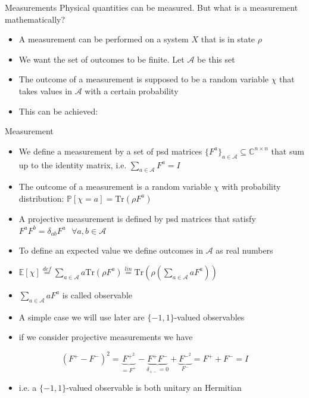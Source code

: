 \begin{frame}{Measurements}
Physical quantities can be measured. But what is a measurement mathematically? \pause
\begin{itemize}
    \item A measurement can be performed on a system $X$ that is in state $\rho$ \pause
    \item We want the set of outcomes to be finite. Let $\mathcal{A}$ be this set \pause
    \item The outcome of a measurement is supposed to be a random variable $\chi$ that takes values in $\mathcal{A}$ with a certain probability \pause
    \item This can be achieved:
\end{itemize}
\begin{definition}{Measurement}
\begin{itemize}    
     \item We define a measurement by a set of psd matrices $\{ F^a \}_{a\in \mathcal{A}} \subseteq \mathbb{C}^{n \times n}$ that sum up to the identity matrix, i.e. $\sum_{a \in \mathcal{A}} F^a = I$
    \item The outcome of a measurement is a random variable $\chi$ with probability distribution: $\mathbb{P}[ \chi = a ] = \text{Tr}(\rho F^a)$
     \item A projective measurement is defined by psd matrices that satisfy $F^aF^b = \delta_{ab}F^a \text{ } \forall a,b \in \mathcal{A}$
\end{itemize}
\end{definition}
\end{frame}    
    
\begin{frame}
\begin{itemize}   
    \item To define an expected value we define outcomes in $\mathcal{A}$ as real numbers \pause
    \item $\mathbb{E} [\chi ] \overset{def}{=} \sum_{a \in \mathcal{A}} a \text{Tr} ( \rho F^a ) \overset{lin}{=}  \text{Tr} ( \rho ( \sum_{a \in \mathcal{A}} a F^a))$ \pause
    \item $\sum_{a \in \mathcal{A}} aF^a$ is called observable \pause
    \item A simple case we will use later are $\{ -1, 1 \}$-valued observables \pause
    \item if we consider projective measurements we have
\end{itemize}
    \begin{equation*}
(F^+-F^-)^2 = \underbrace{F^{+^2}}_{= F^+}- \underbrace{F^+F^-}_{\delta_{+-}=0} + \underbrace{F^{-^2}}_{F^-} = F^+ + F^- = I
\end{equation*}
\begin{itemize}
    \item i.e. a $\{ -1, 1 \}$-valued observable is both unitary an Hermitian 
\end{itemize}

\end{frame}

